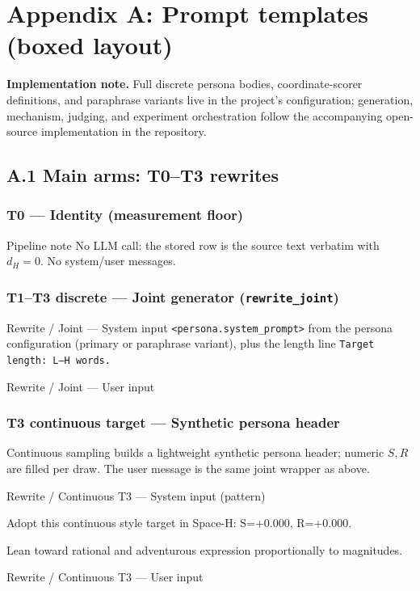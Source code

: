 \begingroup\sloppy

\section{Appendix A: Prompt templates (boxed layout)}
\label{app:prompts}

\noindent\textbf{Implementation note.}
Full discrete persona bodies, coordinate-scorer definitions, and paraphrase variants live in the project's configuration; generation, mechanism, judging, and experiment orchestration follow the accompanying open-source implementation in the repository.

\subsection{A.1 Main arms: T0--T3 rewrites}

\subsubsection{T0 --- Identity (measurement floor)}
\begin{DefnBox}{Pipeline note}
No LLM call: the stored row is the source text verbatim with $d_H{=}0$. No system/user messages.
\end{DefnBox}

\subsubsection{T1--T3 discrete --- Joint generator (\texttt{rewrite\_joint})}
\begin{PromptSystemBox}{Rewrite / Joint --- System input}
\footnotesize
\texttt{<persona.system\_prompt>} from the persona configuration (primary or paraphrase variant), plus the length line \texttt{Target length: L--H words.}
\end{PromptSystemBox}
\begin{PromptUserBox}{Rewrite / Joint --- User input}
\end{PromptUserBox}

\subsubsection{T3 continuous target --- Synthetic persona header}
Continuous sampling builds a lightweight synthetic persona header; numeric $S,R$ are filled per draw. The user message is the same joint wrapper as above.
\begin{PromptSystemBox}{Rewrite / Continuous T3 --- System input (pattern)}
\bgroup\color{white}\footnotesize\ttfamily\raggedright
Adopt this continuous style target in Space-H: S=+0.000, R=+0.000.\par
Lean toward rational and adventurous expression proportionally to magnitudes.\par
\egroup
\end{PromptSystemBox}
\begin{PromptUserBox}{Rewrite / Continuous T3 --- User input}
\end{PromptUserBox}

